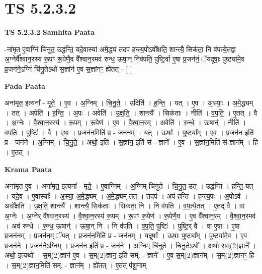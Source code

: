 \documentclass[17pt]{extarticle}
\begin{document}
\section{ TS 5.2.3.2 }

\textbf{TS 5.2.3.2 } \newline
\textbf{Samhita Paata} \newline

-ना॑मृत ए॒वाग्निं चि॑नुत॒ उद्ध॑न्ति॒ यदे॒वास्या॑ अमे॒द्ध्यं तदप॑ हन्त्य॒पोऽवो᳚क्षति॒ शान्त्यै॒ सिक॑ता॒ नि व॑पत्ये॒तद्वा अ॒ग्नेर्वै᳚श्वान॒रस्य॑ रू॒पꣳ रू॒पेणै॒व वै᳚श्वान॒रमव॑ रुन्ध॒ ऊषा॒न् निव॑पति॒ पुष्टि॒र्वा ए॒षा प्र॒जन॑नं॒ ॅयदूषाः॒ पुष्ट्या॑मे॒व प्र॒जन॑ने॒ऽग्निं चि॑नु॒तेऽथो॑ स॒ज्ञांन॑ ए॒व स॒ज्ञांनꣳ॒॒ ह्ये॑तत् - [  ] \newline

\textbf{Pada Paata} \newline

अना॑मृत॒ इत्यना᳚ - मृ॒ते॒ । ए॒व । अ॒ग्निम् । चि॒नु॒ते॒ । उदिति॑ । ह॒न्ति॒ । यत् । ए॒व । अ॒स्याः॒ । अ॒मे॒द्ध्यम् । तत् । अपेति॑ । ह॒न्ति॒ । अ॒पः । अवेति॑ । उ॒क्ष॒ति॒ । शान्त्यै᳚ । सिक॑ताः । नीति॑ । व॒प॒ति॒ । ए॒तत् । वै । अ॒ग्नेः । वै॒श्वा॒न॒रस्य॑ । रू॒पम् । रू॒पेण॑ । ए॒व । वै॒श्वा॒न॒रम् । अवेति॑ । रु॒न्धे॒ । ऊषान्॑ । नीति॑ । व॒प॒ति॒ । पुष्टिः॑ । वै । ए॒षा । प्र॒जन॑न॒मिति॑ प्र - जन॑नम् । यत् । ऊषाः᳚ । पुष्ट्या᳚म् । ए॒व । प्र॒जन॑न॒ इति॑ प्र - जन॑ने । अ॒ग्निम् । चि॒नु॒ते॒ । अथो॒ इति॑ । स॒ज्ञांन॒ इति॑ सं - ज्ञाने᳚ । ए॒व । स॒ज्ञांन॒मिति॑ सं-ज्ञान᳚म् । हि । ए॒तत् ।  \newline


\textbf{Krama Paata} \newline

अना॑मृत ए॒व । अना॑मृत॒ इत्यना᳚ - मृ॒ते॒ । ए॒वाग्निम् । अ॒ग्निम् चि॑नुते । चि॒नु॒त॒ उत् । उद्ध॑न्ति । ह॒न्ति॒ यत् । 
यदे॒व । ए॒वास्याः᳚ । अ॒स्या॒ अ॒मे॒द्ध्यम् । अ॒मे॒द्ध्यम् तत् । तदप॑ । अप॑ हन्ति । ह॒न्त्य॒पः । अ॒पोऽव॑ । 
अवो᳚क्षति । उ॒क्ष॒ति॒ शान्त्यै᳚ । शान्त्यै॒ सिक॑ताः । सिक॑ता॒ नि । नि व॑पति । व॒प॒त्ये॒तत् । ए॒तद् वै । वा अ॒ग्नेः । अ॒ग्नेर् वै᳚श्वान॒रस्य॑ । वै॒श्वा॒न॒रस्य॑ रू॒पम् । रू॒पꣳ रू॒पेण॑ । रू॒पेणै॒व । ए॒व वै᳚श्वान॒रम् । वै॒श्वा॒न॒रमव॑ । अव॑ रुन्धे । रु॒न्ध॒ ऊषान्॑ । ऊषा॒न् नि । नि व॑पति । व॒प॒ति॒ पुष्टिः॑ । पुष्टि॒र् वै । वा ए॒षा । ए॒षा प्र॒जन॑नम् । प्र॒जन॑न॒म् ॅयत् । प्र॒जन॑न॒मिति॑ प्र - जन॑नम् । यदूषाः᳚ । ऊषाः॒ पुष्ट्या᳚म् । पुष्ट्या॑मे॒व । ए॒व प्र॒जन॑ने । प्र॒जन॑ने॒ऽग्निम् । प्र॒जन॑न॒ इति॑ प्र - जन॑ने । अ॒ग्निम् चि॑नुते । चि॒नु॒तेऽथो᳚ । अथो॑ स॒म्(2)ज्ञाने᳚ । अथो॒ इत्यथो᳚ । स॒म्(2)ज्ञान॑ ए॒व । स॒म्(2)ज्ञान॒ इति॑ सम्. - ज्ञाने᳚ । ए॒व स॒म्(2)ज्ञान᳚म् । स॒म्(2)ज्ञानꣳ॒॒ हि । स॒म्(2)ज्ञान॒मिति॑ सम्. - ज्ञान᳚म् । ह्ये॑तत् । ए॒तत् प॑शू॒नाम् \newline
\end{document}
